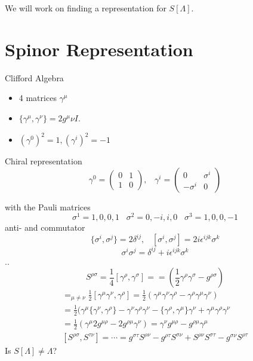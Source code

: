 \documentclass[]{scrartcl}
\begin{document}
We will work on finding a representation for $S[\Lambda]$.

\section{Spinor Representation}
Clifford Algebra
\begin{itemize}
	\item 4 matrices $\gamma^\mu$
	\item $\{\gamma^\mu, \gamma^\nu\} = 2g^\mu\nu I$.
	\item $(\gamma^0)^2 = 1, (\gamma^i)^2 = -1$
\end{itemize}
Chiral representation
$$\gamma^0 =
\begin{pmatrix}
	0 & 1 \\ 1 & 0
\end{pmatrix},
\;\;\; \gamma^i =
\begin{pmatrix}
	0 & \sigma^i \\ -\sigma^i & 0
\end{pmatrix}$$

with the Pauli matrices
\begin{equation}
	\sigma^1 = 1, 0, 0, 1\;\;\; \sigma^2 = 0, -i, i, 0\;\;\;\sigma^3 = 1, 0,0,-1
\end{equation}
anti- and commutator
\begin{equation}
	\{\sigma^i, \sigma^j\} = 2\delta^{ij},\;\;\; [\sigma^i, \sigma^j] = 2i\epsilon^{ijk}\sigma^k
\end{equation}
\begin{equation}
	\sigma^i\sigma^j = \delta^{ij} + i\epsilon^{ijk}\sigma^k
\end{equation}
..
\begin{equation}
	S^{\rho\sigma} = \frac{1}{4}[\gamma^\rho, \gamma^\sigma] =
	= (\frac{1}{2}\gamma^\rho\gamma^\sigma - g^{\rho\sigma})
\end{equation}
\begin{gather}
	[S^{\mu\nu}, \gamma^\rho] =_{\mu\neq\nu} \frac{1}{2}[\gamma^\mu\gamma^\nu, \gamma^\rho] = \frac{1}{2}(\gamma^\mu\gamma^\nu\gamma^\rho - \gamma^\rho\gamma^\mu\gamma^\nu)\nonumber\\
	= \frac{1}{2}(\gamma^\mu \{\gamma^\nu,\gamma^\rho\} - \gamma^\nu\gamma^\rho\gamma^\nu - \{\gamma^\rho,\gamma^\mu\}\gamma^\nu + \gamma^\mu\gamma^\rho\gamma^\nu\nonumber\\
	= \frac{1}{2}(\gamma^\mu 2g^{\mu\rho} - 2g^{\rho\mu}\gamma^\nu) = \gamma^\nu g^{\mu\rho} - g^{\rho\mu}\gamma^\mu\\
	[S^{\rho\sigma},S^{\tau\nu}] = \cdots = g^{\sigma\tau}S^{\rho\nu} - g^{\rho\tau}S^{\sigma\nu} + S^{\rho\nu}S^{\sigma\tau} - g^{\sigma\nu}S^{\rho\tau}
\end{gather}
Is $S[\Lambda]\neq\Lambda$?
\end{document}

